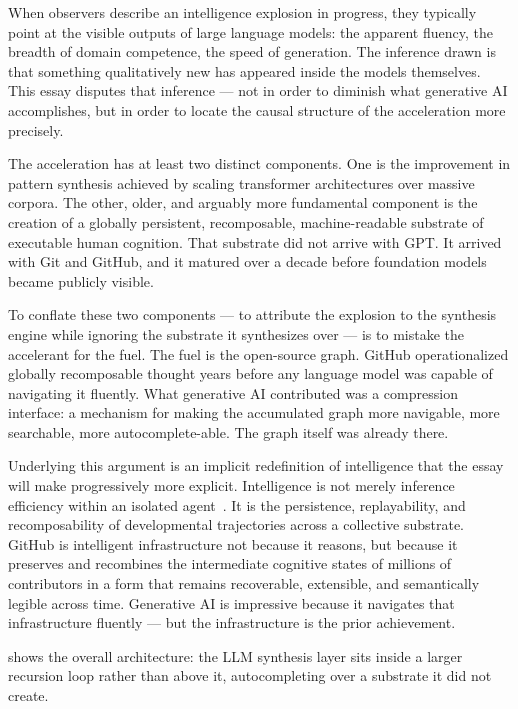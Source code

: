 \documentclass[12pt]{article}
\begin{document}
When observers describe an intelligence explosion in progress, they typically
point at the visible outputs of large language models: the apparent fluency,
the breadth of domain competence, the speed of generation. The inference drawn
is that something qualitatively new has appeared inside the models themselves.
This essay disputes that inference --- not in order to diminish what generative
AI accomplishes, but in order to locate the causal structure of the acceleration
more precisely.

The acceleration has at least two distinct components. One is the improvement
in pattern synthesis achieved by scaling transformer architectures over massive
corpora. The other, older, and arguably more fundamental component is the
creation of a globally persistent, recomposable, machine-readable substrate of
executable human cognition. That substrate did not arrive with GPT. It arrived
with Git and GitHub, and it matured over a decade before foundation models
became publicly visible.

To conflate these two components --- to attribute the explosion to the synthesis
engine while ignoring the substrate it synthesizes over --- is to mistake the
accelerant for the fuel. The fuel is the open-source graph. GitHub
operationalized globally recomposable thought years before any language model
was capable of navigating it fluently. What generative AI contributed was a
compression interface: a mechanism for making the accumulated graph more
navigable, more searchable, more autocomplete-able. The graph itself was already
there.

Underlying this argument is an implicit redefinition of intelligence that the
essay will make progressively more explicit. Intelligence is not merely
inference efficiency within an isolated agent~\cite{russell2010}. It is the
persistence, replayability, and recomposability of developmental trajectories
across a collective substrate. GitHub is intelligent infrastructure not because
it reasons, but because it preserves and recombines the intermediate cognitive
states of millions of contributors in a form that remains recoverable, extensible,
and semantically legible across time. Generative AI is impressive because it
navigates that infrastructure fluently --- but the infrastructure is the
prior achievement.

 shows the overall architecture: the LLM synthesis layer
sits inside a larger recursion loop rather than above it, autocompleting over a
substrate it did not create.
\end{document}
